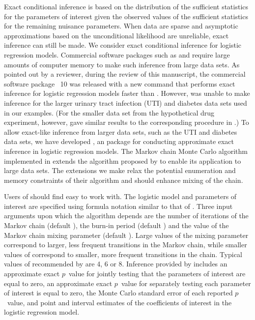 \documentclass[article, shortnames]{jss}
\begin{document}
Exact conditional inference is based on the distribution of the
sufficient statistics for the parameters of interest given the
observed values of the sufficient statistics for the remaining
nuisance parameters. When data are sparse and asymptotic
approximations based on the unconditional likelihood are
unreliable, exact inference can still be made. We consider exact
conditional inference for logistic regression models.  Commercial
software packages such as  \citep{LogXact} and  \citep{SAS}
require large amounts of computer memory to make such inference from large
data sets.
As pointed out by a reviewer, during the review of this
manuscript, the commercial software package ~10 \citep{Stata}
was released with a new command  that performs exact
inference for logistic regression models faster than
. However,  was unable to make
inference for the larger urinary tract infection (UTI) and
diabetes data sets used in our examples. (For the smaller data set
from the hypothetical drug experiment, however, 
gave similar results to the corresponding procedure in
.) To allow exact-like inference from larger data
sets, such as the UTI and diabetes data sets, we have
developed , an  package for
conducting approximate exact inference in logistic regression
models.
The Markov chain Monte Carlo algorithm implemented in
 extends the algorithm proposed by \citet{Forster:2003}
to enable its application to large data sets. The extensions we
make relax the potential enumeration and memory constraints of
their algorithm and should enhance mixing of the chain.

Users of  should find  easy to work with. The
logistic model and parameters of interest are specified using
 formula notation similar to that of . Three
input arguments upon which the  algorithm depends are
the number of iterations of the Markov chain (default ),
the burn-in period (default ) and the
value of the Markov chain mixing parameter (default ).
Large values of the mixing parameter  correspond to larger,
less frequent transitions in the Markov chain, while smaller values of
 correspond to smaller, more frequent transitions in the
chain. Typical values of  recommended by \citet{Forster:2003}
are 4, 6 or 8. Inference
provided by  includes an approximate exact $p$~value for
jointly testing that the parameters of interest are equal to zero,
an approximate exact $p$~value for separately testing each parameter
of interest is equal to zero, the Monte Carlo standard error of
each reported $p$~value, and point and interval estimates of the
coefficients of interest in the logistic regression model.
\end{document}
